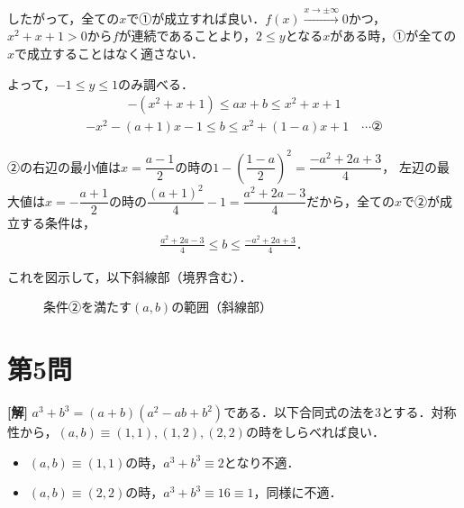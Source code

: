 \documentclass[../main.tex]{subfiles}
\begin{document}
したがって，全ての$x$で①が成立すれば良い．$f(x)\xrightarrow{x\to\pm\infty}0$かつ，$x^2+x+1>0$から$f$が連続であることより，$2\le y$となる$x$がある時，①が全ての$x$で成立することはなく適さない．

よって，$-1\le y\le1$のみ調べる．
\begin{align*}
  -(x^2+x+1)\le ax+b\le x^2+x+1
\end{align*}
\begin{align*}
  -x^2-(a+1)x-1\le b\le x^2+(1-a)x+1\quad\cdots②
\end{align*}

②の右辺の最小値は$x=\dfrac{a-1}{2}$の時の$1-\left(\dfrac{1-a}{2}\right)^2=\dfrac{-a^2+2a+3}{4}$，
左辺の最大値は$x=-\dfrac{a+1}{2}$の時の$\dfrac{(a+1)^2}{4}-1=\dfrac{a^2+2a-3}{4}$だから，全ての$x$で②が成立する条件は，
\begin{align*}
  \frac{a^2+2a-3}{4}\le b\le\frac{-a^2+2a+3}{4}．
\end{align*}

これを図示して，以下斜線部（境界含む）．

\begin{figure}[htb]
  \centering
  \caption{条件②を満たす$(a,b)$の範囲（斜線部）}
\end{figure}

\newpage

\section*{第5問}

{\bf [解]}
$a^3+b^3=(a+b)(a^2-ab+b^2)$である．以下合同式の法を$3$とする．対称性から，$(a,b)\equiv(1,1),(1,2),(2,2)$の時をしらべれば良い．

\begin{itemize}
  \item[$\circ$] $(a,b)\equiv(1,1)$の時，$a^3+b^3\equiv2$となり不適．
  \item[$\circ$] $(a,b)\equiv(2,2)$の時，$a^3+b^3\equiv16\equiv1$，同様に不適．
\end{itemize}
\end{document}
